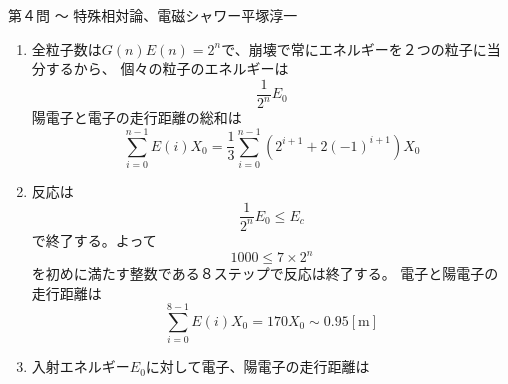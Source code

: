 \begin{answer}{第４問 〜 特殊相対論、電磁シャワー}{平塚淳一}
\begin{enumerate}
\begin{enumerate}
\begin{table}
    \end{table}
    １ステップ前に存在する全ての陽電子と電子は１ステップで全て光子になり、光子の発生源は
    これだけなので
    \begin{equation}
    G(n)= E(n-1)
    \end{equation}
    陽電子と電子の発生源は、１ステップ前の全ての光子と、１ステップ前の陽電子、電子なので
    \begin{equation}
    E(n)= 2G(n-1)+E(n-1)
    \end{equation}
    設問通りS(n)とD(n)を考えると、上の漸化式を用いて
    \begin{align}
    S(n)&=G(n)+E(n)
    =2(G(n-1)+E(n-1))
    =2S(n-1)\\
    D(n)&=2G(n)-E(n)
    =-(2G(n-1)-E(n-1))
    =-D(n-1)
    \end{align}
    これらはすぐ解けて、
    \begin{align}
    S(n)&=2^nS(0)=2^n\\
    D(n)&=(-1)^nD(0)=2(-1)^n
    \end{align}
    これらからG(n)、E(n)を構成すると
    \begin{align}
    G(n)&=\frac{1}{3}(S(n)+D(n))=\frac{1}{3}(2^n+2(-1)^n)\\
    E(n)&=\frac{1}{3}(2S(n)-D(n))=\frac{1}{3}(2^{n+1}+2(-1)^{n+1})
    \end{align}
  \item 全粒子数は$G(n)E(n)=2^n$で、崩壊で常にエネルギーを２つの粒子に当分するから、
    個々の粒子のエネルギーは
    \begin{equation}
    \frac{1}{2^n}E_0
    \end{equation}
    陽電子と電子の走行距離の総和は
    \begin{equation}
    \sum^{n-1}_{i=0}E(i)X_0
    =\frac{1}{3}\sum^{n-1}_{i=0}(2^{i+1}+2(-1)^{i+1})X_0
    \end{equation}
  \item 反応は
    \begin{equation}
    \frac{1}{2^n}E_0 \le E_c
    \end{equation}
    で終了する。よって
    \begin{equation}
    1000 \le 7\times 2^n
    \end{equation}
    を初めに満たす整数である８ステップで反応は終了する。
    電子と陽電子の走行距離は
    \begin{equation}
    \sum^{8-1}_{i=0}E(i)X_0
    =170X_0
    \sim 0.95\mathrm{[m]}
    \end{equation}
  \item 入射エネルギー$E_0$に対して電子、陽電子の走行距離は

\end{enumerate}
\end{enumerate}
\end{answer}
